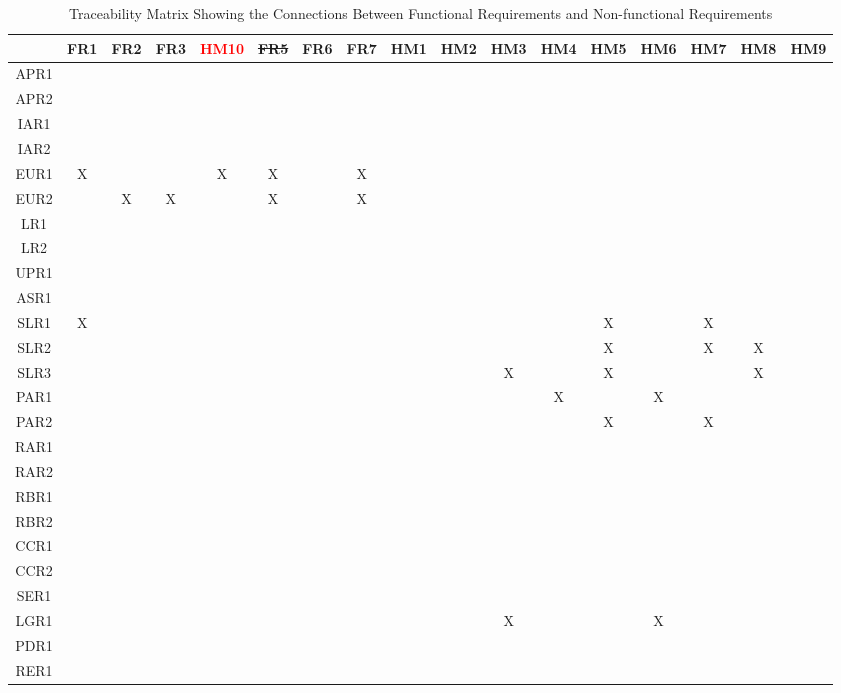 \documentclass[12pt]{article}
\begin{document}
\begin{landscape}
\begin{table}[h!]
\centering
\begin{tabular}{|c|c|c|c|c|c|c|c|c|c|c|c|c|c|c|c|c|}
\hline
	& FR1 & FR2 & FR3 & \textcolor{red}{HM10} & \sout{FR5} & FR6 & FR7 & HM1 & HM2 & HM3 & HM4 & HM5 & HM6 & HM7 & HM8 & HM9 \\
\hline
APR1        & & & & & & & & & & & & & & & & \\ \hline
APR2        & & & & & & & & & & & & & & & &  \\ \hline
IAR1        & & & & & & & & & & & & & & & & \\ \hline
IAR2        & & & & & & & & & & & & & & & & \\ \hline
EUR1        &X & & &X &X & &X & & & & & & & & & \\ \hline
EUR2        & &X &X & &X & &X & & & & & & & & & \\ \hline
LR1         & & & & & & & & & & & & & & & & \\ \hline
LR2         & & & & & & & & & & & & & & & & \\ \hline
UPR1        & & & & & & & & & & & & & & & & \\ \hline
ASR1        & & & & & & & & & & & & & & & & \\ \hline
SLR1        & X& & & & & & & & & & & X& & X& & \\ \hline
SLR2        & & & & & & & & & & & & X& & X& X& \\ \hline
SLR3        & & & & & & & & & & X& & X& & & X& \\ \hline
PAR1        & & & & & & & & & & & X& & X& & & \\ \hline
PAR2        & & & & & & & & & & & & X& & X& & \\ \hline
RAR1        & & & & & & & & & & & & & & & & \\ \hline
RAR2        & & & & & & & & & & & & & & & & \\ \hline
RBR1        & & & & & & & & & & & & & & & & \\ \hline
RBR2        & & & & & & & & & & & & & & & & \\ \hline
CCR1        & & & & & & & & & & & & & & & & \\ \hline
CCR2        & & & & & & & & & & & & & & & & \\ \hline
SER1        & & & & & & & & & & & & & & & & \\ \hline
LGR1        & & & & & & & & & & X & & & X& & & \\ \hline
PDR1        & & & & & & & & & & & & & & & & \\ \hline
RER1        & & & & & & & & & & & & & & & & \\ \hline

\end{tabular}
\caption{Traceability Matrix Showing the Connections Between Functional Requirements and Non-functional Requirements}
\label{Table:A_trace}
\end{table}
\end{landscape}
\end{document}
